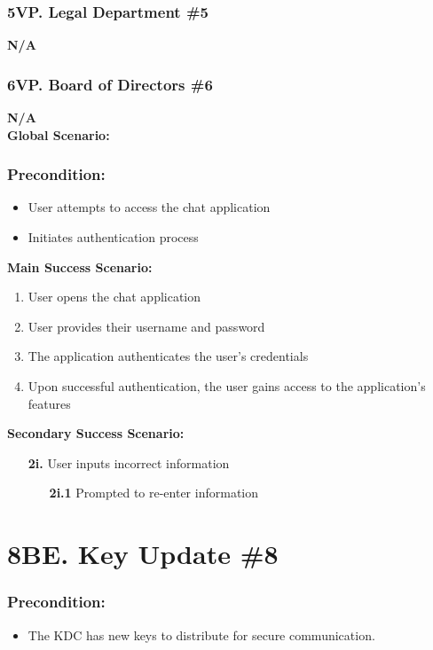 \documentclass[]{article}
\begin{document}
\subsubsection*{5VP. Legal Department \#5}
\textbf{N/A}
\subsubsection*{6VP. Board of Directors \#6}
\textbf{N/A}\\

\noindent \textbf{Global Scenario:}
\subsubsection*{Precondition:}
\begin{itemize}
	\item User attempts to access the chat application
	\item Initiates authentication process
\end{itemize}
\textbf{Main Success Scenario:}
\begin{enumerate}
	\item User opens the chat application
	\item User provides their username and password
	\item The application authenticates the user's credentials
	\item Upon successful authentication, the user gains access to the application's features
\end{enumerate}
\textbf{Secondary Success Scenario:}
\begin{enumerate}
	\item[\textbf{2i.}] User inputs incorrect information
		\begin{enumerate}
			\item[\textbf{2i.1}] Prompted to re-enter information
		\end{enumerate}
\end{enumerate}

\section*{8BE. Key Update \#8}
\subsubsection*{Precondition:}
\begin{itemize}
	\item The KDC has new keys to distribute for secure communication.
\end{itemize}
\end{document}
